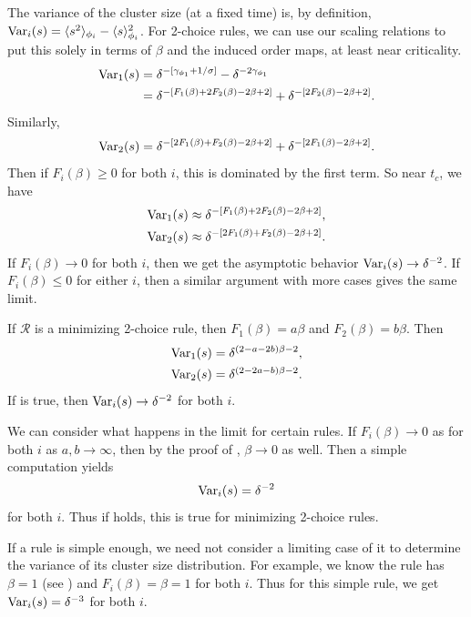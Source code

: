 \documentclass[twoside,10pt]{article}
\begin{document}
The variance of the cluster size (at a fixed time) is, by definition, $\operatorname{Var}_i(s) = \langle s^2 \rangle_{\phi_i} - \langle s \rangle^2_{\phi_i}$. For 2-choice rules, we can use our scaling relations to put this solely in terms of $\beta$ and the induced order maps, at least near criticality.
\begin{align*}
        \operatorname{Var}_1(s) &= \delta^{-[\gamma_{\phi_1} + 1/\sigma]} - \delta^{-2\gamma_{\phi_1}} \\
                  &= \delta^{-[F_1(\beta)+2F_2(\beta)-2\beta+2]} + \delta^{-[2F_2(\beta)-2\beta+2]}.
\end{align*}
Similarly,
\[
        \operatorname{Var}_2(s) = \delta^{-[2F_1(\beta)+F_2(\beta)-2\beta+2]} + \delta^{-[2F_1(\beta)-2\beta+2]}.
\]
Then if $F_i(\beta) \geq 0$ for both $i$, this is dominated by the first term. So near $t_c$, we have
\begin{align*}
        \operatorname{Var}_1(s) &\approx \delta^{-[F_1(\beta)+2F_2(\beta)-2\beta+2]}, \\
        \operatorname{Var}_2(s) &\approx \delta^{-[2F_1(\beta)+F_2(\beta)-2\beta+2]}.
\end{align*}
If $F_{i}(\beta)\to 0$ for both $i$, then we get the asymptotic behavior $\operatorname{Var}_i(s) \to \delta^{-2}$. If $F_{i}(\beta) \leq 0$ for either $i$, then a similar argument with more cases gives the same limit.

\begin{ex}[]
        If $\mathcal{R}$ is a minimizing 2-choice rule, then $F_1(\beta) = a \beta$ and $F_2(\beta)=b \beta$. Then
        \begin{align*}
                \operatorname{Var}_1(s) &= \delta^{(2-a-2b)\beta-2},\\
                \operatorname{Var}_2(s) &= \delta^{(2-2a-b)\beta-2}.
        \end{align*}
        If  is true, then $\operatorname{Var}_i(s) \to \delta^{-2}$ for both $i$.
\end{ex}

We can consider what happens in the limit for certain rules. If $F_{i}(\beta)\to 0$ as for both $i$ as $a,b\to \infty$, then by the proof of , $\beta\to 0$ as well. Then a simple computation yields
\[
	\operatorname{Var}_{i}(s) = \delta^{-2}
\] for both $i$. Thus if  holds, this is true for minimizing 2-choice rules.

If a rule is simple enough, we need not consider a limiting case of it to determine the variance of its cluster size distribution. For example, we know the \ER rule has $\beta=1$ (see ) and $F_{i}(\beta) = \beta = 1$ for both $i$. Thus for this simple rule, we get $\operatorname{Var}_{i}(s) = \delta^{-3}$ for both $i$.
\end{document}
